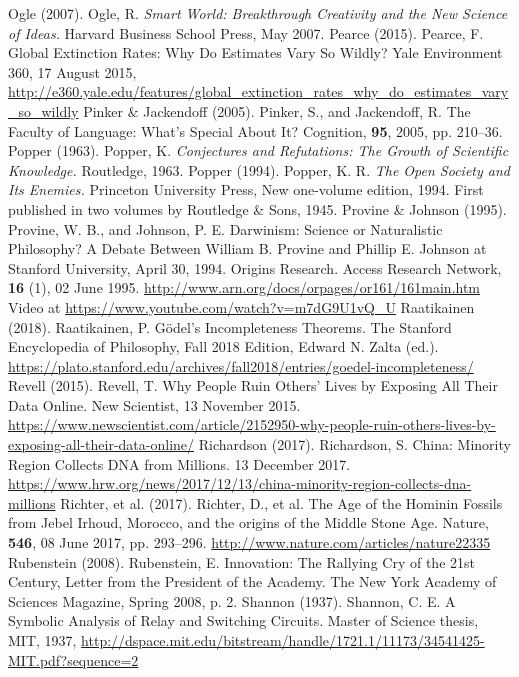 \begin{multicols}{2}
\begin{thebibliography}{99}
 Ogle (2007). Ogle, R. \textit{Smart World: Breakthrough Creativity and the New Science of Ideas.} Harvard Business School Press, May 2007.
 Pearce (2015). Pearce, F. Global Extinction Rates: Why Do Estimates Vary So Wildly? Yale Environment 360, 17 August 2015, \url{http://e360.yale.edu/features/global_extinction_rates_why_do_estimates_vary_so_wildly}
 Pinker \& Jackendoff (2005). Pinker, S., and Jackendoff, R. The Faculty of Language: What’s Special About It? Cognition, \textbf{95}, 2005, pp. 210--36.
 Popper (1963). Popper, K. \textit{Conjectures and Refutations: The Growth of Scientific Knowledge.} Routledge, 1963.
 Popper (1994). Popper, K. R. \textit{The Open Society and Its Enemies.} Princeton University Press, New one-volume edition, 1994. First published in two volumes by Routledge \& Sons, 1945.
 Provine \& Johnson (1995). Provine, W. B., and Johnson, P. E. Darwinism: Science or Naturalistic Philosophy? A Debate Between William B. Provine and Phillip E. Johnson at Stanford University, April 30, 1994. Origins Research. Access Research Network, \textbf{16} (1), 02 June 1995. \url{http://www.arn.org/docs/orpages/or161/161main.htm} Video at \url{https://www.youtube.com/watch?v=m7dG9U1vQ_U}
 Raatikainen (2018). Raatikainen, P. Gödel’s Incompleteness Theorems. The Stanford Encyclopedia of Philosophy, Fall 2018 Edition, Edward N. Zalta (ed.). \url{https://plato.stanford.edu/archives/fall2018/entries/goedel-incompleteness/}
 Revell (2015). Revell, T. Why People Ruin Others’ Lives by Exposing All Their Data Online. New Scientist, 13 November 2015. \url{https://www.newscientist.com/article/2152950-why-people-ruin-others-lives-by-exposing-all-their-data-online/}
 Richardson (2017). Richardson, S. China: Minority Region Collects DNA from Millions. 13 December 2017. \url{https://www.hrw.org/news/2017/12/13/china-minority-region-collects-dna-millions}
 Richter, et al. (2017). Richter, D., et al. The Age of the Hominin Fossils from Jebel Irhoud, Morocco, and the origins of the Middle Stone Age. Nature, \textbf{546}, 08 June 2017, pp. 293--296. \url{http://www.nature.com/articles/nature22335}
 Rubenstein (2008). Rubenstein, E. Innovation: The Rallying Cry of the 21st Century, Letter from the President of the Academy. The New York Academy of Sciences Magazine, Spring 2008, p. 2.
 Shannon (1937). Shannon, C. E. A Symbolic Analysis of Relay and Switching Circuits. Master of Science thesis, MIT, 1937, \url{http://dspace.mit.edu/bitstream/handle/1721.1/11173/34541425-MIT.pdf?sequence=2}

\end{thebibliography}
\end{multicols}
